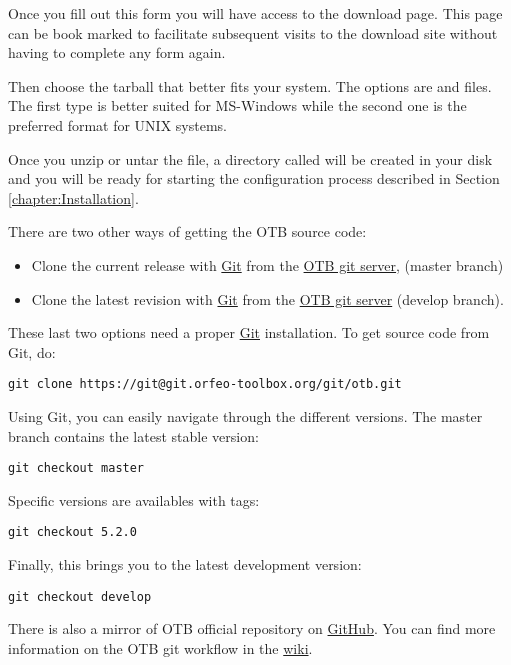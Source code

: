Once you fill out this form you will have access to the download
page. This page can be book marked to facilitate subsequent visits to
the download site without having to complete any form again.

 Then choose the tarball that better fits your system. The options
are  and  files.  The first type is better suited for
MS-Windows while the second one is the preferred format for UNIX systems.

Once you unzip or untar the file, a directory called  will be
created in your disk and you will be ready for starting the configuration
process described in Section \ref{chapter:Installation}.


There are two other ways of getting the OTB source code:
\begin{itemize}
\item Clone the current release with \href{https://git-scm.com/}{Git} from the
  \href{https://git.orfeo-toolbox.org/otb.git}{OTB git server}, (master branch)
\item Clone the latest revision with \href{https://git-scm.com/}{Git} from the
  \href{https://git.orfeo-toolbox.org/otb.git}{OTB git server} (develop branch).
\end{itemize}

These last two options need a proper \href{https://git-scm.com/}{Git} installation. To get source code from Git, do:
\begin{verbatim}
git clone https://git@git.orfeo-toolbox.org/git/otb.git
\end{verbatim}

Using Git, you can easily navigate through the different versions. The master
branch contains the latest stable version:
\begin{verbatim}
git checkout master
\end{verbatim}
Specific versions are availables with tags:
\begin{verbatim}
git checkout 5.2.0
\end{verbatim}
Finally, this brings you to the latest development version:
\begin{verbatim}
git checkout develop
\end{verbatim}

There is also a mirror of OTB official repository on \href{https://github.com/orfeotoolbox/OTB}{GitHub}.
You can find more information on the OTB git workflow in the \href{http://wiki.orfeo-toolbox.org/index.php/Git}{wiki}.

